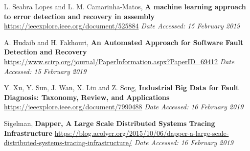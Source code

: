 \documentclass[12pt]{article}
\begin{document}
{\footnotesize
\begin{thebibliography}{9}
    L. Seabra Lopes and L. M. Camarinha-Matos, \textbf{A machine learning approach to error detection and recovery in assembly}
    \url{https://ieeexplore.ieee.org/document/525884}
    \textit{Date Accessed: 15 February 2019}

    A. Hudaib and H. Fakhouri, \textbf{An Automated Approach for Software Fault Detection and Recovery}
    \url{https://www.scirp.org/journal/PaperInformation.aspx?PaperID=69412}
    \textit{Date Accessed: 15 February 2019}

    Y. Xu, Y. Sun, J. Wan, X. Liu and Z. Song, \textbf{Industrial Big Data for Fault Diagnosis: Taxonomy, Review, and Applications}
    \url{https://ieeexplore.ieee.org/document/7990488}
    \textit{Date Accessed: 16 February 2019}

    Sigelman, \textbf{Dapper, A Large Scale Distributed Systems Tracing Infrastructure}
    \url{https://blog.acolyer.org/2015/10/06/dapper-a-large-scale-distributed-systems-tracing-infrastructure/}
    \textit{Date Accessed: 16 February 2019}
\end{thebibliography}
}
\end{document}
